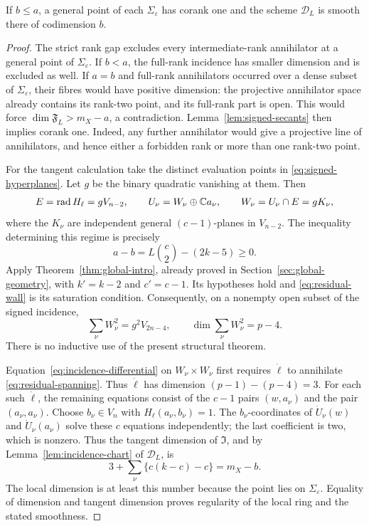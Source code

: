 \begin{lemma}\label{lem:secant-smooth}
If $b\le a$, a general point of each $\Sigma_\varepsilon$ has corank one and the scheme $\mathscr D_L$ is smooth there of codimension $b$.
\end{lemma}
\begin{proof}
The strict rank gap excludes every intermediate-rank annihilator at a general point of $\Sigma_\varepsilon$. If $b<a$, the full-rank incidence has smaller dimension and is excluded as well. If $a=b$ and full-rank annihilators occurred over a dense subset of $\Sigma_\varepsilon$, their fibres would have positive dimension: the projective annihilator space already contains its rank-two point, and its full-rank part is open. This would force $\dim\mathfrak F_L>m_X-a$, a contradiction. Lemma~\ref{lem:signed-secants} then implies corank one. Indeed, any further annihilator would give a projective line of annihilators, and hence either a forbidden rank or more than one rank-two point.

For the tangent calculation take the distinct evaluation points in \eqref{eq:signed-hyperplanes}. Let $g$ be the binary quadratic vanishing at them. Then
\[
 E=\operatorname{rad}H_\ell=gV_{n-2},\qquad
 U_\nu=W_\nu\oplus\mathbb C a_\nu,\qquad
 W_\nu=U_\nu\cap E=gK_\nu,
\]
where the $K_\nu$ are independent general $(c-1)$-planes in $V_{n-2}$. The inequality determining this regime is precisely
\begin{equation}\label{eq:residual-wall}
 a-b=L\binom{c}{2}-(2k-5)\ge0.
\end{equation}
Apply Theorem~\ref{thm:global-intro}, already proved in Section~\ref{sec:global-geometry}, with $k'=k-2$ and $c'=c-1$. Its hypotheses hold and \eqref{eq:residual-wall} is its saturation condition. Consequently, on a nonempty open subset of the signed incidence,
\begin{equation}\label{eq:residual-spanning}
 \sum_\nu W_\nu^2=g^2V_{2n-4},\qquad
                  \dim\sum_\nu W_\nu^2=p-4.
\end{equation}
There is no inductive use of the present structural theorem.

Equation~\eqref{eq:incidence-differential} on $W_\nu\times W_\nu$ first requires $\dot\ell$ to annihilate \eqref{eq:residual-spanning}. Thus $\dot\ell$ has dimension $(p-1)-(p-4)=3$. For each such $\dot\ell$, the remaining equations consist of the $c-1$ pairs $(w,a_\nu)$ and the pair $(a_\nu,a_\nu)$. Choose $b_\nu\in V_n$ with $H_\ell(a_\nu,b_\nu)=1$. The $b_\nu$-coordinates of $\dot U_\nu(w)$ and $\dot U_\nu(a_\nu)$ solve these $c$ equations independently; the last coefficient is two, which is nonzero. Thus the tangent dimension of $\mathfrak I$, and by Lemma~\ref{lem:incidence-chart} of $\mathscr D_L$, is
\[
 3+\sum_\nu\{c(k-c)-c\}=m_X-b.
\]
The local dimension is at least this number because the point lies on $\Sigma_\varepsilon$. Equality of dimension and tangent dimension proves regularity of the local ring and the stated smoothness.
\end{proof}
